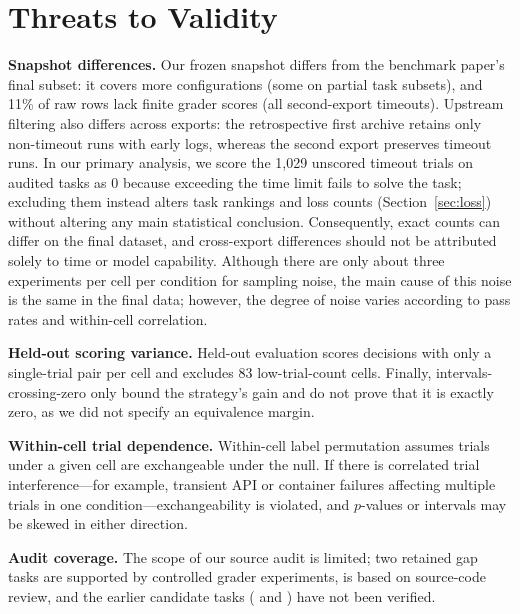 \documentclass[10pt,conference]{IEEEtran}
\newif\ifkeepcuts \keepcutsfalse
\newcommand{\cut}[1]{\ifkeepcuts #1\fi}
\begin{document}
\section{Threats to Validity}
\textbf{Snapshot differences.} Our frozen snapshot differs from the benchmark paper's final subset: it covers more configurations (some on partial task subsets), and 11\% of raw rows lack finite grader scores (all second-export timeouts). Upstream filtering also differs across exports: the retrospective first archive retains only non-timeout runs with early logs, whereas the second export preserves timeout runs. In our primary analysis, we score the 1,029 unscored timeout trials on audited tasks as 0 because exceeding the time limit fails to solve the task; excluding them instead alters task rankings and loss counts (Section~\ref{sec:loss}) without altering any main statistical conclusion. Consequently, exact counts can differ on the final dataset, and cross-export differences should not be attributed solely to time or model capability. Although there are only about three experiments per cell per condition for sampling noise, the main cause of this noise is the same in the final data; however, the degree of noise varies according to pass rates and within-cell correlation.

\textbf{Held-out scoring variance.} Held-out evaluation scores decisions with only a single-trial pair per cell and excludes 83 low-trial-count cells.\cut{ Due to the noise of a single split, we average over repeated splits (60 for forests, 2,000 for other rules) and bootstrap-resample across tasks; however, repeated splits reuse the same trials instead of providing new replications, and bootstrap intervals do not account for variation due to refitting forests on new task samples.} Finally, intervals-crossing-zero only bound the strategy's gain and do not prove that it is exactly zero, as we did not specify an equivalence margin.

\textbf{Within-cell trial dependence.} Within-cell label permutation assumes trials under a given cell are exchangeable under the null. If there is correlated trial interference---for example, transient API or container failures affecting multiple trials in one condition---exchangeability is violated, and $p$-values or intervals may be skewed in either direction.

\textbf{Audit coverage.} The scope of our source audit is limited; two retained gap tasks are supported by controlled grader experiments,  is based on source-code review, and the earlier candidate tasks ( and ) have not been verified.\cut{ As we have not conducted new-agent trajectory experiments, we cannot determine the amount of lift that would be retained when prompts specify grading rules.}
\end{document}
